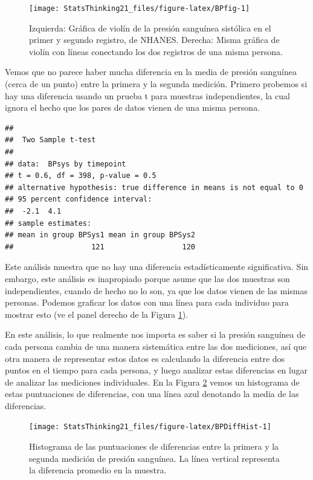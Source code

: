 \documentclass[
  12pt,
]{book}
\begin{document}
\begin{figure}
\texttt{[image: StatsThinking21\_files/figure-latex/BPfig-1]} \caption{Izquierda: Gráfica de violín de la presión sanguínea sistólica en el primer y segundo registro, de NHANES. Derecha: Misma gráfica de violín con líneas conectando los dos registros de una misma persona.}\label{fig:BPfig}
\end{figure}

Vemos que no parece haber mucha diferencia en la media de presión sanguínea (cerca de un punto) entre la primera y la segunda medición. Primero probemos si hay una diferencia usando un prueba t para muestras independientes, la cual ignora el hecho que los pares de datos vienen de una misma persona.

\begin{verbatim}
## 
##  Two Sample t-test
## 
## data:  BPsys by timepoint
## t = 0.6, df = 398, p-value = 0.5
## alternative hypothesis: true difference in means is not equal to 0
## 95 percent confidence interval:
##  -2.1  4.1
## sample estimates:
## mean in group BPSys1 mean in group BPSys2 
##                  121                  120
\end{verbatim}

Este análisis muestra que no hay una diferencia estadísticamente significativa. Sin embargo, este análisis es inapropiado porque asume que las dos muestras son independientes, cuando de hecho no lo son, ya que los datos vienen de las mismas personas. Podemos graficar los datos con una línea para cada individuo para mostrar esto (ve el panel derecho de la Figura \ref{fig:BPfig}).

En este análisis, lo que realmente nos importa es saber si la presión sanguínea de cada persona cambia de una manera sistemática entre las dos mediciones, así que otra manera de representar estos datos es calculando la diferencia entre dos puntos en el tiempo para cada persona, y luego analizar estas diferencias en lugar de analizar las mediciones individuales. En la Figura \ref{fig:BPDiffHist} vemos un histograma de estas puntuaciones de diferencias, con una línea azul denotando la media de las diferencias.

\begin{figure}
\texttt{[image: StatsThinking21\_files/figure-latex/BPDiffHist-1]} \caption{Histograma de las puntuaciones de diferencias entre la primera y la segunda medición de presión sanguínea. La línea vertical representa la diferencia promedio en la muestra.}\label{fig:BPDiffHist}
\end{figure}
\end{document}

